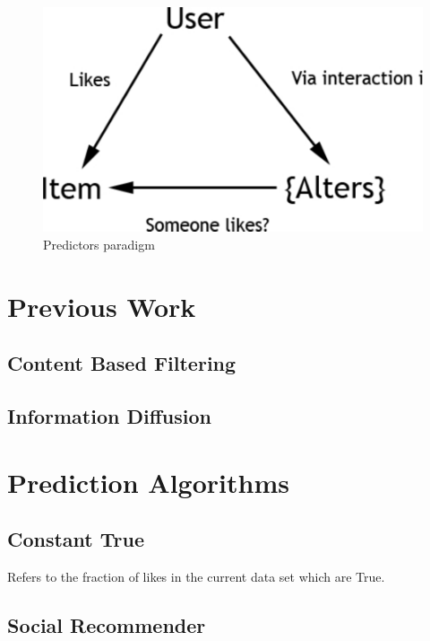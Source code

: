 \begin{figure}[h]
	\begin{center}
		\includegraphics[scale=0.60]{imgs/alters.pdf}
		\caption{Predictors paradigm}
	\end{center}
\end{figure}
\section{Previous Work}
\label{sec:pw}

\subsection{Content Based Filtering}
\label{sec:cbf}

\subsection{Information Diffusion}
\label{sec:id}

\section{Prediction Algorithms}
\label{sec:meth}

\subsection{Constant True}
\label{sec:const}

Refers to the fraction of likes in the current data set which are True.

\subsection{Social Recommender}
\label{sec:sr}

